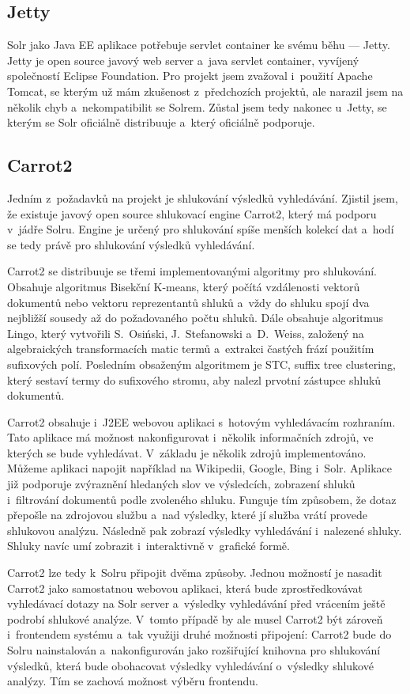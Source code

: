 \subsection{Jetty}
Solr jako Java EE aplikace potřebuje servlet container ke svému běhu --- Jetty. Jetty\cite{jetty:doc} je open source javový web server a~java servlet container, vyvíjený společností Eclipse Foundation. Pro projekt jsem zvažoval i~použití Apache Tomcat\cite{tomcat:doc}, se kterým už mám zkušenost z~předchozích projektů, ale narazil jsem na několik chyb a~nekompatibilit se Solrem. Zůstal jsem tedy nakonec u~Jetty, se kterým se Solr oficiálně distribuuje a~který oficiálně podporuje.

\subsection{Carrot2}
Jedním z~požadavků na projekt je shlukování výsledků vyhledávání. Zjistil jsem, že existuje javový open source shlukovací engine Carrot2\cite{carrot2:manual}, který má podporu v~jádře Solru. Engine je určený pro shlukování spíše menších kolekcí dat a~hodí se tedy právě pro shlukování výsledků vyhledávání.

Carrot2 se distribuuje se třemi implementovanými algoritmy pro shlukování. Obsahuje algoritmus Bisekční K-means, který počítá vzdálenosti vektorů dokumentů nebo vektoru reprezentantů shluků a~vždy do shluku spojí dva nejbližší sousedy až do požadovaného počtu shluků. Dále obsahuje algoritmus Lingo, který vytvořili S.~Osiński, J.~Stefanowski a~D.~Weiss, založený na algebraických transformacích matic termů a~extrakci častých frází použitím sufixových polí. Posledním obsaženým algoritmem je STC, suffix tree clustering, který sestaví termy do sufixového stromu, aby nalezl prvotní zástupce shluků dokumentů.

Carrot2 obsahuje i~J2EE webovou aplikaci s~hotovým vyhledávacím rozhraním. Tato aplikace má možnost nakonfigurovat i~několik informačních zdrojů, ve kterých se bude vyhledávat. V~základu je několik zdrojů implementováno. Můžeme aplikaci napojit například na Wikipedii, Google, Bing i~Solr. Aplikace již podporuje zvýraznění hledaných slov ve výsledcích, zobrazení shluků i~filtrování dokumentů podle zvoleného shluku. Funguje tím způsobem, že dotaz přepošle na zdrojovou službu a~nad výsledky, které jí služba vrátí provede shlukovou analýzu. Následně pak zobrazí výsledky vyhledávání i~nalezené shluky. Shluky navíc umí zobrazit i~interaktivně v~grafické formě.

Carrot2 lze tedy k~Solru připojit dvěma způsoby. Jednou možností je nasadit Carrot2 jako samostatnou webovou aplikaci, která bude zprostředkovávat vyhledávací dotazy na Solr server a~výsledky vyhledávání před vrácením ještě podrobí shlukové analýze. V~tomto případě by ale musel Carrot2 být zároveň i~frontendem systému a~tak využiji druhé možnosti připojení: Carrot2 bude do Solru nainstalován a~nakonfigurován jako rozšiřující knihovna pro shlukování výsledků, která bude obohacovat výsledky vyhledávání o~výsledky shlukové analýzy. Tím se zachová možnost výběru frontendu.